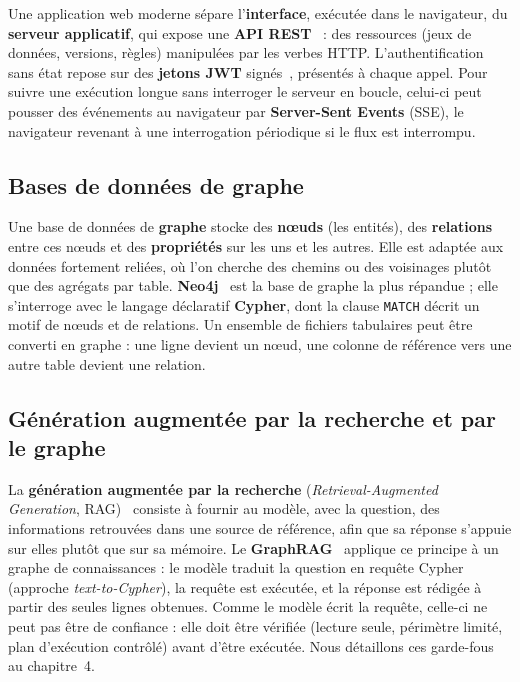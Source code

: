 Une application web moderne sépare l'\textbf{interface}, exécutée dans le navigateur, du \textbf{serveur applicatif}, qui expose une \textbf{API REST}~\cite{fielding} : des ressources (jeux de données, versions, règles) manipulées par les verbes HTTP. L'authentification sans état repose sur des \textbf{jetons JWT} signés~\cite{jwt}, présentés à chaque appel. Pour suivre une exécution longue sans interroger le serveur en boucle, celui-ci peut pousser des événements au navigateur par \textbf{Server-Sent Events} (SSE), le navigateur revenant à une interrogation périodique si le flux est interrompu.

\subsection{Bases de données de graphe}

Une base de données de \textbf{graphe} stocke des \textbf{nœuds} (les entités), des \textbf{relations} entre ces nœuds et des \textbf{propriétés} sur les uns et les autres. Elle est adaptée aux données fortement reliées, où l'on cherche des chemins ou des voisinages plutôt que des agrégats par table. \textbf{Neo4j}~\cite{neo4j} est la base de graphe la plus répandue ; elle s'interroge avec le langage déclaratif \textbf{Cypher}, dont la clause \texttt{MATCH} décrit un motif de nœuds et de relations. Un ensemble de fichiers tabulaires peut être converti en graphe : une ligne devient un nœud, une colonne de référence vers une autre table devient une relation.

\subsection{Génération augmentée par la recherche et par le graphe}

La \textbf{génération augmentée par la recherche} (\textit{Retrieval-Augmented Generation}, RAG)~\cite{lewis} consiste à fournir au modèle, avec la question, des informations retrouvées dans une source de référence, afin que sa réponse s'appuie sur elles plutôt que sur sa mémoire. Le \textbf{GraphRAG}~\cite{edge} applique ce principe à un graphe de connaissances : le modèle traduit la question en requête Cypher (approche \textit{text-to-Cypher}), la requête est exécutée, et la réponse est rédigée à partir des seules lignes obtenues. Comme le modèle écrit la requête, celle-ci ne peut pas être de confiance : elle doit être vérifiée (lecture seule, périmètre limité, plan d'exécution contrôlé) avant d'être exécutée. Nous détaillons ces garde-fous au chapitre~4.

